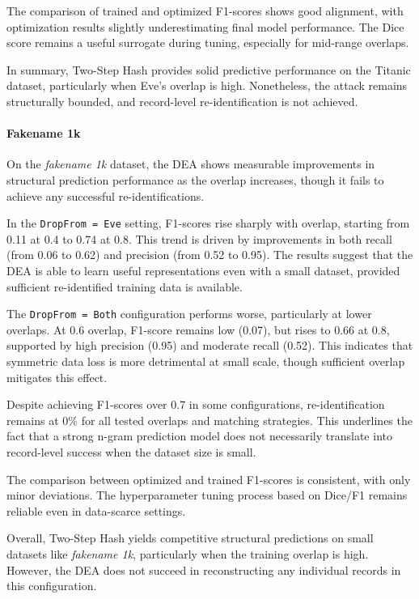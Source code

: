 The comparison of trained and optimized F1-scores shows good alignment, with optimization results slightly underestimating final model performance. The Dice score remains a useful surrogate during tuning, especially for mid-range overlaps.

In summary, Two-Step Hash provides solid predictive performance on the Titanic dataset, particularly when Eve’s overlap is high. Nonetheless, the attack remains structurally bounded, and record-level re-identification is not achieved.


\paragraph{Fakename 1k}

On the \textit{fakename 1k} dataset, the DEA shows measurable improvements in structural prediction performance as the overlap increases, though it fails to achieve any successful re-identifications.

In the \texttt{DropFrom = Eve} setting, F1-scores rise sharply with overlap, starting from 0.11 at 0.4 to 0.74 at 0.8. This trend is driven by improvements in both recall (from 0.06 to 0.62) and precision (from 0.52 to 0.95). The results suggest that the DEA is able to learn useful representations even with a small dataset, provided sufficient re-identified training data is available.

The \texttt{DropFrom = Both} configuration performs worse, particularly at lower overlaps. At 0.6 overlap, F1-score remains low (0.07), but rises to 0.66 at 0.8, supported by high precision (0.95) and moderate recall (0.52). This indicates that symmetric data loss is more detrimental at small scale, though sufficient overlap mitigates this effect.

Despite achieving F1-scores over 0.7 in some configurations, re-identification remains at 0\% for all tested overlaps and matching strategies. This underlines the fact that a strong n-gram prediction model does not necessarily translate into record-level success when the dataset size is small.

The comparison between optimized and trained F1-scores is consistent, with only minor deviations. The hyperparameter tuning process based on Dice/F1 remains reliable even in data-scarce settings.

Overall, Two-Step Hash yields competitive structural predictions on small datasets like \textit{fakename 1k}, particularly when the training overlap is high. However, the DEA does not succeed in reconstructing any individual records in this configuration.




